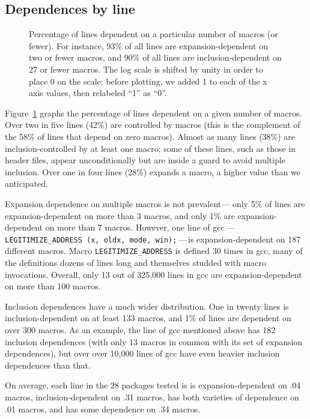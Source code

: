 \documentclass[10pt]{article}
\def\numpackageslesstwo{28}
\newcommand{\pkg}[1]{\textsf{#1}}
\newcommand{\captionsmall}[1]{\caption[]{\small #1}}
\begin{document}
\subsection{Dependences by line}

\begin{figure}
\centerline{}

\captionsmall{Percentage of lines dependent on a particular number of macros (or
  fewer).  For instance, 93\% of all lines are expansion-dependent on two
  or fewer macros, and 90\% of all lines are inclusion-dependent on 27 or
  fewer macros.  The log scale is shifted by unity in order to place 0
  on the scale:  before plotting, we added 1 to each of the x axis values,
  then relabeled ``1'' as ``0''.}
\label{fig:dep-byline}
\end{figure}

Figure~\ref{fig:dep-byline} graphs the percentage of lines dependent on a
given number of macros.  Over two in five lines (42\%) are controlled by
macros (this is the complement of the 58\% of lines that depend on zero
macros).  Almost as many lines (38\%) are inclusion-controlled by at least
one macro; some of these lines, such as those in header files, appear
unconditionally but are inside a guard to avoid multiple inclusion.  Over
one in four lines (28\%) expands a macro, a higher value than we
anticipated.

Expansion dependence on multiple macros is not prevalent\,---\,only 5\% of
lines are expansion-dependent on more than 3 macros, and only 1\% are
expansion-dependent on more than 7 macros.  However, one line of
\pkg{gcc}\,---\,{\tt \verb|LEGITIMIZE_ADDRESS| (x, oldx, mode,
win);}\,---\,is expansion-dependent on 187 different macros.  Macro
\verb|LEGITIMIZE_ADDRESS| is defined 30 times in \pkg{gcc}, many of the
definitions dozens of lines long and themselves studded with macro
invocations.  Overall, only 13 out of 325,000 lines in \pkg{gcc} are
expansion-dependent on more than 100 macros.

Inclusion dependences have a much wider distribution.  One in twenty lines
is inclusion-dependent on at least 133 macros, and 1\% of lines are
dependent on over 300 macros.  As an example, the line of \pkg{gcc}
mentioned above has 182 inclusion dependences (with only 13 macros in
common with its set of expansion dependences), but over over 10,000 lines
of \pkg{gcc} have even heavier inclusion dependences than that.

On average, each line in the {\numpackageslesstwo} packages tested is is
expansion-dependent on .04 macros, inclusion-dependent on .31 macros, has
both varieties of dependence on .01 macros, and has some dependence on .34
macros.
      
\end{document}
